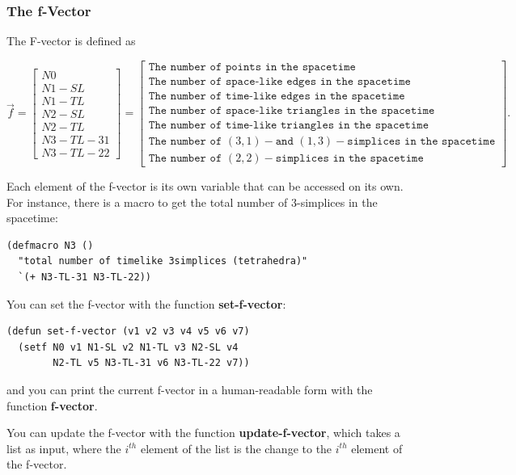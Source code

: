 \message{ !name(programmers_guide.tex)}\documentclass[12pt]{article}
\begin{document}
\subsubsection{The f-Vector}
The F-vector is defined as 
\begin{small}
\begin{displaymath}
  \vec{f} = \left[\begin{array}{c}N0\\N1-SL\\N1-TL\\N2-SL\\N2-TL\\
      N3-TL-31\\N3-TL-22\end{array}\right]
  = \left[\begin{array}{c}\texttt{The number of points in the spacetime}\\
      \texttt{The number of space-like edges in the spacetime}\\
      \texttt{The number of time-like edges in the spacetime}\\
      \texttt{The number of space-like triangles in the spacetime}\\
      \texttt{The number of time-like triangles in the spacetime}\\
      \texttt{The number of }(3,1)-\texttt{and }(1,3)-\texttt{simplices in the spacetime}\\
      \texttt{The number of }(2,2)-\texttt{simplices in the spacetime}\end{array}\right].
\end{displaymath}
\end{small}
Each element of the f-vector is its own variable that can be accessed
on its own. For instance, there is a macro to get the total number of
3-simplices in the spacetime:
\begin{lstlisting}
(defmacro N3 ()
  "total number of timelike 3simplices (tetrahedra)"
  `(+ N3-TL-31 N3-TL-22))
\end{lstlisting}
You can set the f-vector with the function \textbf{set-f-vector}:
\begin{lstlisting}
(defun set-f-vector (v1 v2 v3 v4 v5 v6 v7)
  (setf N0 v1 N1-SL v2 N1-TL v3 N2-SL v4
        N2-TL v5 N3-TL-31 v6 N3-TL-22 v7))
\end{lstlisting}
and you can print the current f-vector in a human-readable form with
the function \textbf{f-vector}.

You can update the f-vector with the function
\textbf{update-f-vector}, which takes a list as input, where the
$i^{th}$ element of the list is the change to the $i^{th}$ element of
the f-vector.
\end{document}
